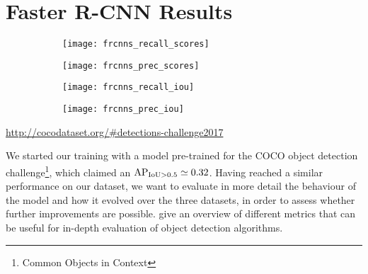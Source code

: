 
\section{Faster R-CNN Results}\label{sec:frcnn_results}

	\begin{figure}[ht]
		\begin{subfigure}{.49\linewidth}
			\texttt{[image: frcnns\_recall\_scores]}
			\caption{}
			\label{fig:frcnns_recall_scores}
		\end{subfigure}
		\begin{subfigure}{.49\linewidth}
			\texttt{[image: frcnns\_prec\_scores]}
			\caption{}
			\label{fig:frcnns_prec_scores}
		\end{subfigure}
		\begin{subfigure}{.49\linewidth}
			\texttt{[image: frcnns\_recall\_iou]}
			\caption{}
			\label{fig:frcnns_recall_iou}
		\end{subfigure}
		\begin{subfigure}{.49\linewidth}
			\texttt{[image: frcnns\_prec\_iou]}
			\caption{}
			\label{fig:frcnns_prec_iou}
		\end{subfigure}
		\caption[\FRCNN{} results]{}
		\label{fig:frcnn_results}
	\end{figure}

	\urldef{\cocoURL}\url{http://cocodataset.org/#detections-challenge2017}

	We started our training with a model pre-trained for the COCO object detection challenge\footnote{Common Objects in Context \cocoURL}, which claimed an \(\operatorname{\operatorname{AP}_{\operatorname{IoU} > 0.5}} \simeq 0.32\). Having reached a similar performance on our  dataset, we want to evaluate in more detail the behaviour of the model and how it evolved over the three datasets, in order to assess whether further improvements are possible.  give an overview of different metrics that can be useful for in-depth evaluation of object detection algorithms.

